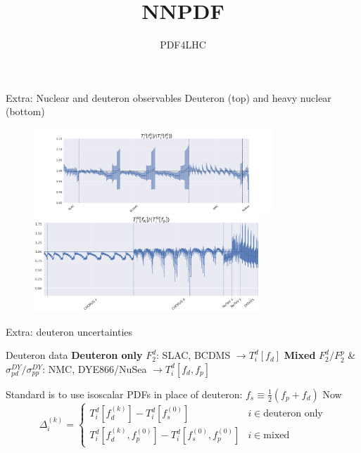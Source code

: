 \title{NNPDF}
\author[Rosalyn Pearson]{}
\date{PDF4LHC}

\begin{frame}{Extra: Nuclear and deuteron observables}
\footnotesize{Deuteron (top) and heavy nuclear (bottom) }
  \begin{figure}
    \includegraphics[width=90mm, trim={30mm, 0, 30mm, 0}]{nuclear_uncs/obsdeut.png}
    \includegraphics[width=85mm]{nuclear_uncs/obsnuc.png}
  \end{figure}
\end{frame}

\begin{frame}{Extra: deuteron uncertainties}

\begin{block}{Deuteron data}
{\bf Deuteron only} $F_2^d$: SLAC, BCDMS  $\to T_i^d[f_d]$
\newline
{\bf Mixed} $F_2^d/F_2^p$ \& $\sigma_{pd}^{DY}/\sigma_{pp}^{DY}$: NMC, DYE866/NuSea  $ \to T_i^d[f_d, f_p]$
\end{block}
Standard is to use isoscalar PDFs in place of deuteron: $f_s \equiv \frac{1}{2}(f_p + f_d)$
Now 
\begin{equation}
\Delta_i^{(k)} = \begin{cases}
T_i^d[f_d^{(k)}] - T_i^d[f_s^{(0)}] & i \in \text{deuteron only}\\
T_i^d[f_d^{(k)}, f_p^{(0)}] - T_i^d[f_s^{(0)}, f_p^{(0)}] & i \in \text{mixed}
\end{cases}
\end{equation}
\end{frame}

